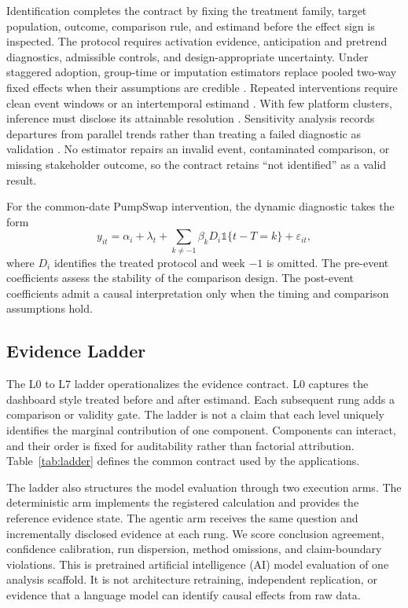 \documentclass{article}
\begin{document}
Identification completes the contract by fixing the treatment family, target population, outcome, comparison rule, and estimand before the effect sign is inspected. The protocol requires activation evidence, anticipation and pretrend diagnostics, admissible controls, and design-appropriate uncertainty. Under staggered adoption, group-time or imputation estimators replace pooled two-way fixed effects when their assumptions are credible \citep{callaway2021,sunabraham2021,borusyak2024}. Repeated interventions require clean event windows or an intertemporal estimand \citep{dechaisemartin2026}. With few platform clusters, inference must disclose its attainable resolution \citep{mackinnonwebb2018}. Sensitivity analysis records departures from parallel trends rather than treating a failed diagnostic as validation \citep{rothsantanna2023,rambachanroth2023}. No estimator repairs an invalid event, contaminated comparison, or missing stakeholder outcome, so the contract retains ``not identified'' as a valid result.

For the common-date PumpSwap intervention, the dynamic diagnostic takes the form
\begin{equation}
  y_{it}=\alpha_i+\lambda_t+
  \sum_{k\neq-1}\beta_k D_i\mathbb{1}\{t-T=k\}+\varepsilon_{it},
  \label{eq:event-study}
\end{equation}
where $D_i$ identifies the treated protocol and week $-1$ is omitted. The pre-event coefficients assess the stability of the comparison design. The post-event coefficients admit a causal interpretation only when the timing and comparison assumptions hold.

\subsection{Evidence Ladder}

The L0 to L7 ladder operationalizes the evidence contract. L0 captures the dashboard style treated before and after estimand. Each subsequent rung adds a comparison or validity gate. The ladder is not a claim that each level uniquely identifies the marginal contribution of one component. Components can interact, and their order is fixed for auditability rather than factorial attribution. Table~\ref{tab:ladder} defines the common contract used by the applications.





The ladder also structures the model evaluation through two execution arms. The deterministic arm implements the registered calculation and provides the reference evidence state. The agentic arm receives the same question and incrementally disclosed evidence at each rung. We score conclusion agreement, confidence calibration, run dispersion, method omissions, and claim-boundary violations. This is pretrained artificial intelligence (AI) model evaluation of one analysis scaffold. It is not architecture retraining, independent replication, or evidence that a language model can identify causal effects from raw data.
\end{document}
